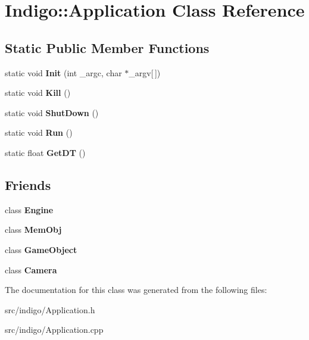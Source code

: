 \hypertarget{class_indigo_1_1_application}{}\section{Indigo\+:\+:Application Class Reference}
\label{class_indigo_1_1_application}
\subsection*{Static Public Member Functions}
\begin{DoxyCompactItemize}
\item 
\mbox{\label{class_indigo_1_1_application_a1187d12c4cfd234da50c460eb8f207d7}} 
static void {\bfseries Init} (int \+\_\+argc, char $\ast$\+\_\+argv\mbox{[}$\,$\mbox{]})
\item 
\mbox{\label{class_indigo_1_1_application_ad9d4706c035d5064ed52eafa9868cf60}} 
static void {\bfseries Kill} ()
\item 
\mbox{\label{class_indigo_1_1_application_ab64b70bb88997428bb5b49eaa013228f}} 
static void {\bfseries Shut\+Down} ()
\item 
\mbox{\label{class_indigo_1_1_application_aaf09cd6cb412086dc039e28cdb059f0d}} 
static void {\bfseries Run} ()
\item 
\mbox{\label{class_indigo_1_1_application_ab0c5855e6fad35691820e44f48eeb319}} 
static float {\bfseries Get\+DT} ()
\end{DoxyCompactItemize}
\subsection*{Friends}
\begin{DoxyCompactItemize}
\item 
\mbox{\label{class_indigo_1_1_application_a3e1914489e4bed4f9f23cdeab34a43dc}} 
class {\bfseries Engine}
\item 
\mbox{\label{class_indigo_1_1_application_a5b789837fad8c88af8443fc6aa839c75}} 
class {\bfseries Mem\+Obj}
\item 
\mbox{\label{class_indigo_1_1_application_a00df87c957d8f7ee0fc51f07a0542f4a}} 
class {\bfseries Game\+Object}
\item 
\mbox{\label{class_indigo_1_1_application_ad8bd9afbbd7af19d996da80e9d25890d}} 
class {\bfseries Camera}
\end{DoxyCompactItemize}


The documentation for this class was generated from the following files\+:\begin{DoxyCompactItemize}
\item 
src/indigo/Application.\+h\item 
src/indigo/Application.\+cpp\end{DoxyCompactItemize}
